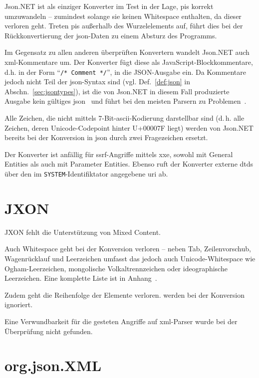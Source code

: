 Json.NET ist als einziger Konverter im Test in der Lage, \glspl{pi} korrekt umzuwandeln -- zumindest solange sie keinen Whitespace enthalten, da dieser verloren geht. Treten \glspl{pi} außerhalb des Wurzelelements auf, führt dies bei der Rückkonvertierung der \acrshort{json}-Daten zu einem Absturz des Programms.

Im Gegensatz zu allen anderen überprüften Konvertern wandelt Json.NET auch \acrshort{xml}-Kommentare um. Der Konverter fügt diese als JavaScript-Blockkommentare, d.h. in der Form \enquote{\texttt{/* Comment */}}, in die JSON-Ausgabe ein. Da Kommentare jedoch nicht Teil der \acrshort{json}-Syntax sind (vgl. Def.~\ref{def:json} in Abschn.~\ref{sec:jsontypes}), ist die von Json.NET in diesem Fall produzierte Ausgabe kein gültiges \acrshort{json}~\cite{ecma404,rfc7159} und führt bei den meisten Parsern zu Problemen~\cite[Abschn.~2.1,~4.1]{seriot2016minefield}.

Alle Zeichen, die nicht mittels 7-Bit-\acrshort{ascii}-Kodierung darstellbar sind (d.\,h. alle Zeichen, deren Unicode-Codepoint hinter U+00007F liegt) werden von Json.NET bereits bei der Konversion in \acrshort{json} durch zwei Fragezeichen ersetzt.

Der Konverter ist anfällig für \acrshort{ssrf}-Angriffe mittels \acrshort{xxe}, sowohl mit General Entities als auch mit Parameter Entities. Ebenso ruft der Konverter externe \glspl{dtd} über den im \texttt{SYSTEM}-Identifiktator angegebene \acrshort{uri} ab.

\section{JXON}
\label{sec:jxon}

JXON fehlt die Unterstützung von Mixed Content.

Auch Whitespace geht bei der Konversion verloren -- neben Tab, Zeilenvorschub, Wagenrücklauf und Leerzeichen umfasst das jedoch auch Unicode-Whitespace wie Ogham-Leerzeichen, mongolische Volkaltrennzeichen oder ideographische Leerzeichen. Eine komplette Liste ist in Anhang~\label{appx:unicode-whitespace}.

Zudem geht die Reihenfolge der Elemente verloren.  werden bei der Konversion ignoriert.

Eine Verwundbarkeit für die gesteten Angriffe auf \acrshort{xml}-Parser wurde bei der Überprüfung nicht gefunden.

\section{org.json.XML}
\label{sec:orgjsonxml}

